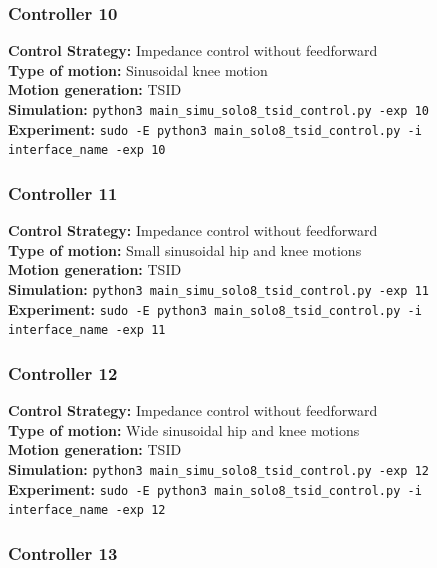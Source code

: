 \documentclass[12pt,a4paper]{article}
\begin{document}
\subsubsection{Controller 10}

\textbf{Control Strategy:} Impedance control without feedforward \\
\textbf{Type of motion:} Sinusoidal knee motion \\
\textbf{Motion generation:} TSID \\
\textbf{Simulation:} \texttt{python3 main\_simu\_solo8\_tsid\_control.py -exp 10} \\
\textbf{Experiment:} \texttt{sudo -E python3 main\_solo8\_tsid\_control.py -i interface\_name -exp 10} \\

\subsubsection{Controller 11}

\textbf{Control Strategy:} Impedance control without feedforward \\
\textbf{Type of motion:} Small sinusoidal hip and knee motions \\
\textbf{Motion generation:} TSID \\
\textbf{Simulation:} \texttt{python3 main\_simu\_solo8\_tsid\_control.py -exp 11} \\
\textbf{Experiment:} \texttt{sudo -E python3 main\_solo8\_tsid\_control.py -i interface\_name -exp 11} \\

\subsubsection{Controller 12}

\textbf{Control Strategy:} Impedance control without feedforward \\
\textbf{Type of motion:} Wide sinusoidal hip and knee motions \\
\textbf{Motion generation:} TSID \\
\textbf{Simulation:} \texttt{python3 main\_simu\_solo8\_tsid\_control.py -exp 12} \\
\textbf{Experiment:} \texttt{sudo -E python3 main\_solo8\_tsid\_control.py -i interface\_name -exp 12} \\

\subsubsection{Controller 13}
\end{document}
